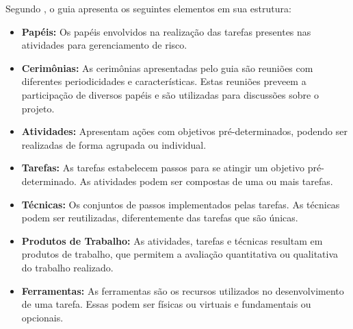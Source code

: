 \documentclass[
    12pt,       %
    openright,      %
    twoside,      %
    a4paper,      %
    english,      %
    french,       %
    spanish,      %
    brazil,       %
    ]{abntex2}
\begin{document}
Segundo , o guia apresenta os seguintes elementos em sua estrutura:

\begin{itemize}
    \item \textbf{Papéis: } Os papéis envolvidos na realização das tarefas presentes nas atividades para gerenciamento de risco.
    \item \textbf{Cerimônias: } As cerimônias apresentadas pelo guia são reuniões com diferentes periodicidades e características. Estas reuniões preveem a participação de diversos papéis e são utilizadas para discussões sobre o projeto. 
    \item \textbf{Atividades: } Apresentam ações com objetivos pré-determinados, podendo ser realizadas de forma agrupada ou individual.
    \item \textbf{Tarefas: } As tarefas estabelecem passos para se atingir um objetivo pré-determinado. As atividades podem ser compostas de uma ou mais tarefas. 
    \item \textbf{Técnicas: } Os conjuntos de passos implementados pelas tarefas. As técnicas podem ser reutilizadas, diferentemente das tarefas que são únicas.
    \item \textbf{Produtos de Trabalho: } As atividades, tarefas e técnicas resultam em produtos de trabalho, que permitem a avaliação quantitativa ou qualitativa do trabalho realizado.  
    \item \textbf{Ferramentas: } As ferramentas são os recursos utilizados no desenvolvimento de uma tarefa. Essas podem ser físicas ou virtuais e fundamentais ou opcionais.
\end{itemize}
\end{document}
